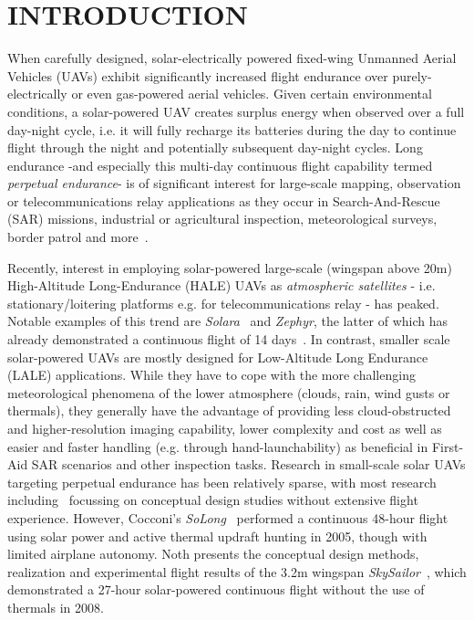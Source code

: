 \section{INTRODUCTION}


When carefully designed, solar-electrically powered fixed-wing Unmanned Aerial Vehicles (UAVs) exhibit significantly increased flight endurance over purely-electrically or even gas-powered aerial vehicles. Given certain environmental conditions, a solar-powered UAV creates surplus energy when observed over a full day-night cycle, i.e. it will fully recharge its batteries during the day to continue flight through the night and potentially subsequent day-night cycles. Long endurance -and especially this multi-day continuous flight capability termed \emph{perpetual endurance}- is of significant interest for large-scale mapping, observation or telecommunications relay applications as they occur in Search-And-Rescue (SAR) missions, industrial or agricultural inspection, meteorological surveys, border patrol and more~\cite{NASA_Pathfinder}.

Recently, interest in employing solar-powered large-scale (wingspan above 20m) High-Altitude Long-Endurance (HALE) UAVs as \emph{atmospheric satellites} - i.e. stationary/loitering platforms e.g. for telecommunications relay - has peaked. Notable examples of this trend are \textit{Solara}~\cite{IEEE_AtmosphericSatellites} and \textit{Zephyr}, the latter of which has already demonstrated a continuous flight of 14 days~\cite{QinetiQ_Zephyr14dayRecord}. In contrast, smaller scale solar-powered UAVs are mostly designed for Low-Altitude Long Endurance (LALE) applications. While they have to cope with the more challenging meteorological phenomena of the lower atmosphere (clouds, rain, wind gusts or thermals), they generally have the advantage of providing less cloud-obstructed and higher-resolution imaging capability, lower complexity and cost as well as easier and faster handling (e.g. through hand-launchability) as beneficial in First-Aid SAR scenarios and other inspection tasks. Research in small-scale solar UAVs targeting perpetual endurance has been relatively sparse, with most research including~\cite{Morton_ICRA2013} focussing on conceptual design studies without extensive flight experience. However, Cocconi's \textit{SoLong}~\cite{Cocconi_SoLong} performed a continuous 48-hour flight using solar power and active thermal updraft hunting in 2005, though with limited airplane autonomy. Noth presents the conceptual design methods, realization and experimental flight results of the 3.2m wingspan \textit{SkySailor}~\cite{Noth_PhD}, which demonstrated a 27-hour solar-powered continuous flight without the use of thermals in 2008. 

